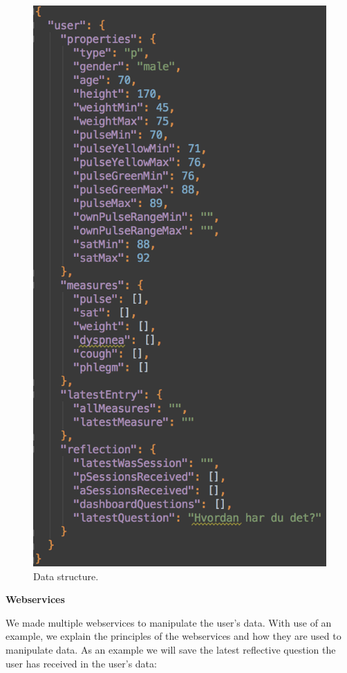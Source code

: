 \begin{figure}[h]
\centering
\includegraphics[scale=0.5]{images/implementation/dataStructure.png}
\caption{Data structure.}
\label{fig:dStructure}
\end{figure}

\textbf{Webservices}

We made multiple webservices to manipulate the user's data. With use of an example, we explain the principles of the webservices and how they are used to manipulate data. As an example we will save the latest reflective question the user has received in the user's data:

